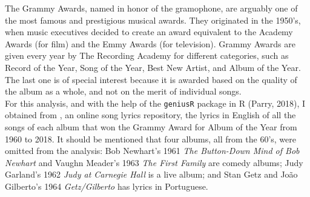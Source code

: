 \documentclass{article}
\begin{document}
The Grammy Awards, named in honor of the gramophone, are arguably one of the most famous and prestigious musical awards. They originated in the 1950's, when music executives decided to create an award equivalent to the Academy Awards (for film) and the Emmy Awards (for television). Grammy Awards are given every year by The Recording Academy for different categories, such as Record of the Year, Song of the Year, Best New Artist, and Album of the Year. The last one is of special interest because it is awarded based on the quality of the album as a whole, and not on the merit of individual songs. \\



For this analysis, and with the help of the \texttt{geniusR} package in \textsf{R} (Parry, 2018), I obtained from \href{https://genius.com/}{}, an online song lyrics repository, the lyrics in English of all the songs of each album that won the Grammy Award for Album of the Year from 1960 to 2018. It should be mentioned that four albums, all from the 60's, were omitted from the analysis: Bob Newhart's 1961 \textit{The Button-Down Mind of Bob Newhart} and Vaughn Meader's 1963 \textit{The First Family} are comedy albums; Judy Garland's 1962 \textit{Judy at Carnegie Hall} is a live album; and Stan Getz and Jo\~{a}o Gilberto's 1964 \textit{Getz/Gilberto} has lyrics in Portuguese.  \\



\end{document}
